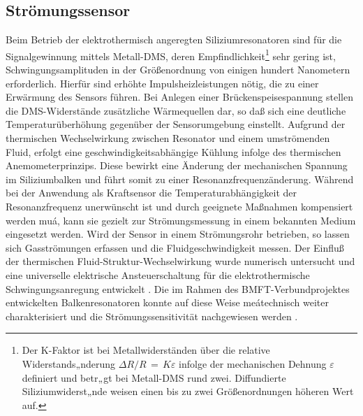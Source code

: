 \subsection{Strömungssensor}
\label{stroemungssensor}

Beim Betrieb der elektrothermisch angeregten Siliziumresonatoren sind
für die Signalgewinnung mittels Metall-DMS, deren
Empfindlichkeit\footnote{Der K-Faktor ist bei Metallwiderständen über
die relative Widerstands„nderung $\Delta R/R \, = \, K \varepsilon$
infolge der mechanischen Dehnung $\varepsilon$
definiert und betr„gt bei Metall-DMS rund zwei. Diffundierte
Siliziumwiderst„nde weisen einen bis zu zwei Größenordnungen höheren
Wert auf.} sehr gering ist,
Schwingungsamplituden in der Größenordnung von einigen hundert
Nanometern erforderlich. Hierfür sind erhöhte Impulsheizleistungen nötig,
die zu einer Erwärmung des Sensors führen. Bei Anlegen einer
Brückenspeisespannung stellen die DMS-Widerstände zusätzliche Wärmequellen
dar, so daß sich eine deutliche Temperaturüberhöhung gegenüber der
Sensorumgebung einstellt. Aufgrund der thermischen Wechselwirkung zwischen
Resonator und einem umströmenden Fluid, erfolgt eine
geschwindigkeitsabhängige Kühlung infolge des thermischen
Anemometerprinzips. Diese bewirkt eine Änderung der mechanischen
Spannung im Siliziumbalken und führt somit zu einer Resonanzfrequenzänderung.
Während bei der Anwendung als Kraftsensor die Temperaturabhängigkeit der
Resonanzfrequenz unerwünscht ist und durch geeignete Maßnahmen kompensiert
werden muá, kann sie gezielt zur Strömungsmessung in einem bekannten Medium
eingesetzt werden. Wird der Sensor in einem Strömungsrohr betrieben, so
lassen sich
Gasströmungen erfassen und die Fluidgeschwindigkeit messen. Der Einfluß der
thermischen Fluid-Struktur-Wechselwirkung wurde numerisch untersucht
\cite{Mes93} und eine universelle elektrische Ansteuerschaltung für die
elektrothermische
Schwingungsanregung entwickelt \cite{Wie93}. Die im Rahmen des
BMFT-Verbundprojektes entwickelten Balkenresonatoren konnte auf diese Weise
meátechnisch weiter charakterisiert und die Strömungssensitivität
nachgewiesen werden \cite{Fab93b}.
